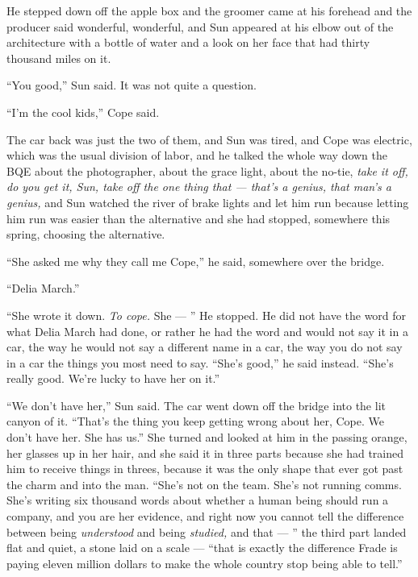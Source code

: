\documentclass[11pt,openany]{book}
\newcommand{\scenebreak}{\par\vspace{0.5\baselineskip}\begin{center}\textasteriskcentered\quad\textasteriskcentered\quad\textasteriskcentered\end{center}\vspace{0.5\baselineskip}\par}
\begin{document}
He stepped down off the apple box and the groomer came at his forehead and the producer said wonderful, wonderful, and Sun appeared at his elbow out of the architecture with a bottle of water and a look on her face that had thirty thousand miles on it.

``You good,'' Sun said. It was not quite a question.

``I'm the cool kids,'' Cope said.


\scenebreak


The car back was just the two of them, and Sun was tired, and Cope was electric, which was the usual division of labor, and he talked the whole way down the BQE about the photographer, about the grace light, about the no-tie, \textit{take it off, do you get it, Sun, take off the one thing that --- that's a genius, that man's a genius,} and Sun watched the river of brake lights and let him run because letting him run was easier than the alternative and she had stopped, somewhere this spring, choosing the alternative.

``She asked me why they call me Cope,'' he said, somewhere over the bridge.

``Delia March.''

``She wrote it down. \textit{To cope.} She --- '' He stopped. He did not have the word for what Delia March had done, or rather he had the word and would not say it in a car, the way he would not say a different name in a car, the way you do not say in a car the things you most need to say. ``She's good,'' he said instead. ``She's really good. We're lucky to have her on it.''

``We don't have her,'' Sun said. The car went down off the bridge into the lit canyon of it. ``That's the thing you keep getting wrong about her, Cope. We don't have her. She has us.'' She turned and looked at him in the passing orange, her glasses up in her hair, and she said it in three parts because she had trained him to receive things in threes, because it was the only shape that ever got past the charm and into the man. ``She's not on the team. She's not running comms. She's writing six thousand words about whether a human being should run a company, and you are her evidence, and right now you cannot tell the difference between being \textit{understood} and being \textit{studied,} and that --- '' the third part landed flat and quiet, a stone laid on a scale --- ``that is exactly the difference Frade is paying eleven million dollars to make the whole country stop being able to tell.''
\end{document}
